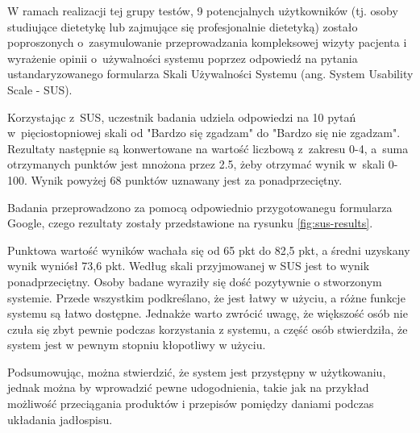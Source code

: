 \par
W ramach realizacji tej grupy testów, 9 potencjalnych użytkowników (tj. osoby studiujące dietetykę lub zajmujące się profesjonalnie dietetyką)
zostało poproszonych o~zasymulowanie przeprowadzania kompleksowej wizyty pacjenta
i wyrażenie opinii o~używalności systemu poprzez odpowiedź na pytania ustandaryzowanego formularza Skali Używalności Systemu (ang. System Usability Scale - SUS)\cite{url:sus}.

\par
Korzystając z~SUS, uczestnik badania udziela odpowiedzi na 10 pytań w~pięciostopniowej skali od "Bardzo się zgadzam" do "Bardzo się nie zgadzam".
Rezultaty następnie są konwertowane na wartość liczbową z~zakresu 0-4, a~suma otrzymanych punktów jest mnożona przez 2.5, żeby otrzymać wynik w~skali 0-100.
Wynik powyżej 68 punktów uznawany jest za ponadprzeciętny.
\par
Badania przeprowadzono za pomocą odpowiednio przygotowanegu formularza Google\cite{tech:google-forms}, czego rezultaty zostały przedstawione na rysunku \ref{fig:sus-results}.
%
%


Punktowa wartość wyników wachała się od 65 pkt do 82,5 pkt, a średni uzyskany wynik wyniósł 73,6 pkt.
Według skali przyjmowanej w SUS jest to wynik ponadprzeciętny.
Osoby badane wyraziły się dość pozytywnie o stworzonym systemie.
Przede wszystkim podkreślano, że jest łatwy w użyciu, a różne funkcje systemu są łatwo dostępne.
Jednakże warto zwrócić uwagę, że większość osób nie czuła się zbyt pewnie podczas korzystania z systemu,
a część osób stwierdziła, że system jest w pewnym stopniu kłopotliwy w użyciu.

\par
Podsumowując, można stwierdzić, że system jest przystępny w użytkowaniu, jednak można by wprowadzić pewne udogodnienia,
takie jak na przykład możliwość przeciągania produktów i przepisów pomiędzy daniami podczas układania jadłospisu.

\thispagestyle{normal}
